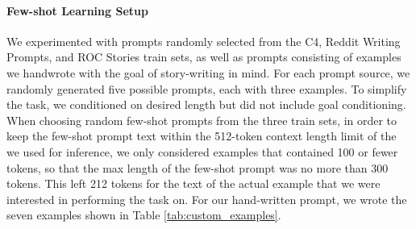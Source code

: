 \paragraph{Few-shot Learning Setup}
We experimented with prompts randomly selected from the C4, Reddit Writing Prompts, and ROC Stories train sets, as well as prompts consisting of examples we handwrote with the goal of story-writing in mind.
For each prompt source, we randomly generated five possible prompts, each with three examples.
To simplify the task, we conditioned on desired length but did not include goal conditioning.
When choosing random few-shot prompts from the three train sets, in order to keep the few-shot prompt text within the 512-token context length limit of the \LLM \citep{thoppilan2022lamda} we used for inference, we only considered examples that contained 100 or fewer tokens, so that the max length of the few-shot prompt was no more than 300 tokens.
This left 212 tokens for the text of the actual example that we were interested in performing the \FitB{} task on.
For our hand-written prompt, we wrote the seven examples shown in Table \ref{tab:custom_examples}.


